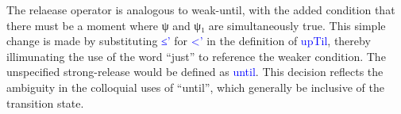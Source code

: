\documentclass[a4paper, 11pt]{article}
\newcommand{\blue}[1]{\textcolor{blue}{#1}}
\begin{document}
The relaease operator is analogous to weak-until, with the added condition that
there must be a moment where ψ and ψ₁ are simultaneously true. This simple
change is made by substituting \blue{≤'} for \blue{<'} in the definition of
\blue{upTil}, thereby illimunating the use of the word ``just'' to reference the
weaker condition. The unspecified strong-release would be defined as
\blue{until}. This decision reflects the ambiguity in the colloquial uses of
``until'', which generally be inclusive of the transition state.

\begin{code}%
%
\>[4]\AgdaSpace{}%
\AgdaSymbol{:}\AgdaSpace{}%
\AgdaSpace{}%
\AgdaSpace{}%
\AgdaSpace{}%
\AgdaSpace{}%
\AgdaSpace{}%
\AgdaSpace{}%
\<%
\\
%
\>[4]\AgdaSpace{}%
\AgdaSpace{}%
\AgdaSpace{}%
\AgdaSpace{}%
\AgdaSymbol{=}\AgdaSpace{}%
\AgdaSpace{}%
\AgdaSymbol{(}\AgdaSpace{}%
\AgdaSymbol{:}\AgdaSpace{}%
\AgdaSymbol{)}\AgdaSpace{}%
\AgdaSpace{}%
\AgdaSpace{}%
\AgdaSpace{}%
\AgdaSpace{}%
\AgdaSpace{}%
\AgdaSymbol{(}\AgdaSpace{}%
\AgdaSpace{}%
\AgdaSymbol{)}\AgdaSpace{}%
\AgdaSpace{}%
\<%
\\
%
\\[\AgdaEmptyExtraSkip]%
%
\>[4]\AgdaSpace{}%
\AgdaSymbol{:}\AgdaSpace{}%
\AgdaSpace{}%
\AgdaSpace{}%
\AgdaSpace{}%
\AgdaSpace{}%
\AgdaSpace{}%
\AgdaSpace{}%
\<%
\\
%
\>[4]\AgdaSpace{}%
\AgdaSpace{}%
\AgdaSpace{}%
\AgdaSpace{}%
\AgdaSymbol{=}\AgdaSpace{}%
\AgdaFunction{Σ[}\AgdaSpace{}%
\AgdaSpace{}%
\AgdaSpace{}%
\AgdaSpace{}%
\AgdaFunction{]}\AgdaSpace{}%
\AgdaSymbol{(}\AgdaSpace{}%
\AgdaSpace{}%
\AgdaSymbol{)}\AgdaSpace{}%
\AgdaSpace{}%
\AgdaSpace{}%
\AgdaSpace{}%
\AgdaSpace{}%
\AgdaSpace{}%
\AgdaSpace{}%
\<%
\end{code}
\end{document}
